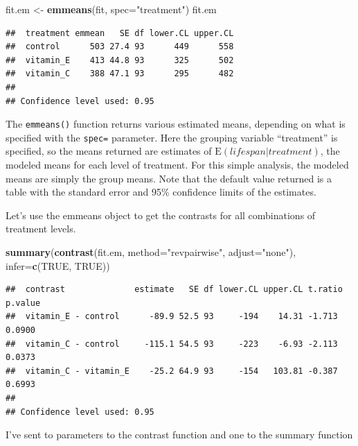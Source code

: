 \documentclass[]{book}
\newenvironment{Shaded}{\begin{snugshade}}{\end{snugshade}}
\newcommand{\KeywordTok}[1]{\textcolor[rgb]{0.13,0.29,0.53}{\textbf{#1}}}
\newcommand{\DataTypeTok}[1]{\textcolor[rgb]{0.13,0.29,0.53}{#1}}
\newcommand{\StringTok}[1]{\textcolor[rgb]{0.31,0.60,0.02}{#1}}
\newcommand{\OtherTok}[1]{\textcolor[rgb]{0.56,0.35,0.01}{#1}}
\newcommand{\NormalTok}[1]{#1}
\begin{document}
\begin{Shaded}
\begin{Highlighting}[]
\NormalTok{fit.em <-}\StringTok{ }\KeywordTok{emmeans}\NormalTok{(fit, }\DataTypeTok{spec=}\StringTok{"treatment"}\NormalTok{)}
\NormalTok{fit.em}
\end{Highlighting}
\end{Shaded}

\begin{verbatim}
##  treatment emmean   SE df lower.CL upper.CL
##  control      503 27.4 93      449      558
##  vitamin_E    413 44.8 93      325      502
##  vitamin_C    388 47.1 93      295      482
## 
## Confidence level used: 0.95
\end{verbatim}

The \texttt{emmeans()} function returns various estimated means,
depending on what is specified with the \texttt{spec=} parameter. Here
the grouping variable ``treatment'' is specified, so the means returned
are estimates of \(\mathrm{E}(lifespan | treatment)\), the modeled means
for each level of treatment. For this simple analysis, the modeled means
are simply the group means. Note that the default value returned is a
table with the standard error and 95\% confidence limits of the
estimates.

Let's use the emmeans object to get the contrasts for all combinations
of treatment levels.

\begin{Shaded}
\begin{Highlighting}[]
\KeywordTok{summary}\NormalTok{(}\KeywordTok{contrast}\NormalTok{(fit.em, }\DataTypeTok{method=}\StringTok{"revpairwise"}\NormalTok{, }\DataTypeTok{adjust=}\StringTok{"none"}\NormalTok{), }\DataTypeTok{infer=}\KeywordTok{c}\NormalTok{(}\OtherTok{TRUE}\NormalTok{, }\OtherTok{TRUE}\NormalTok{))}
\end{Highlighting}
\end{Shaded}

\begin{verbatim}
##  contrast              estimate   SE df lower.CL upper.CL t.ratio p.value
##  vitamin_E - control      -89.9 52.5 93     -194    14.31 -1.713  0.0900 
##  vitamin_C - control     -115.1 54.5 93     -223    -6.93 -2.113  0.0373 
##  vitamin_C - vitamin_E    -25.2 64.9 93     -154   103.81 -0.387  0.6993 
## 
## Confidence level used: 0.95
\end{verbatim}

I've sent to parameters to the contrast function and one to the summary
function
\end{document}
